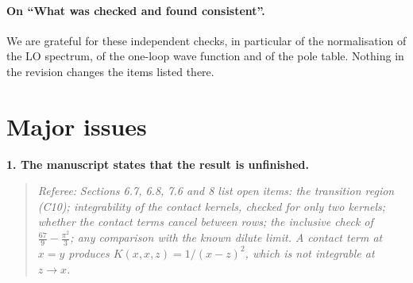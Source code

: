 \documentclass[a4paper,11pt]{article}
\newcommand{\point}[1]{\par\medskip\noindent\textbf{#1}\par}
\newcommand{\referee}[1]{\begin{quote}\small\emph{Referee:} \emph{#1}\end{quote}}
\begin{document}
\paragraph{On ``What was checked and found consistent''.} We are grateful for these independent checks, in particular of the normalisation of the LO spectrum, of the one-loop wave function and of the pole table. Nothing in the revision changes the items listed there.

\section*{Major issues}

\point{1. The manuscript states that the result is unfinished.}
\referee{Sections 6.7, 6.8, 7.6 and 8 list open items: the transition region (C10); integrability of the contact kernels, checked for only two kernels; whether the contact terms cancel between rows; the inclusive check of $\frac{67}{9}-\frac{\pi^2}{3}$; any comparison with the known dilute limit. A contact term at $x=y$ produces $K(x,x,z)=1/(x-z)^2$, which is not integrable at $z\to x$.}
\end{document}
